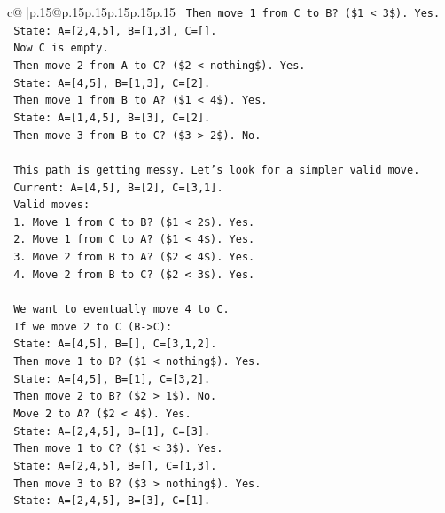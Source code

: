 \documentclass{article}
\begin{document}
{\begin{supertabular}{c@{$\;$}|p{.15\linewidth}@{}p{.15\linewidth}p{.15\linewidth}p{.15\linewidth}p{.15\linewidth}p{.15\linewidth}}
{{{\texttt{   Then move 1 from C to B? (\$1 < 3\$). Yes.} \\
\texttt{   State: A={[}2,4,5{]}, B={[}1,3{]}, C={[}{]}.} \\
\texttt{   Now C is empty.} \\
\texttt{   Then move 2 from A to C? (\$2 < nothing\$). Yes.} \\
\texttt{   State: A={[}4,5{]}, B={[}1,3{]}, C={[}2{]}.} \\
\texttt{   Then move 1 from B to A? (\$1 < 4\$). Yes.} \\
\texttt{   State: A={[}1,4,5{]}, B={[}3{]}, C={[}2{]}.} \\
\texttt{   Then move 3 from B to C? (\$3 > 2\$). No.} \\
\\ 
\texttt{   This path is getting messy. Let's look for a simpler valid move.} \\
\texttt{   Current: A={[}4,5{]}, B={[}2{]}, C={[}3,1{]}.} \\
\texttt{   Valid moves:} \\
\texttt{   1. Move 1 from C to B? (\$1 < 2\$). Yes.} \\
\texttt{   2. Move 1 from C to A? (\$1 < 4\$). Yes.} \\
\texttt{   3. Move 2 from B to A? (\$2 < 4\$). Yes.} \\
\texttt{   4. Move 2 from B to C? (\$2 < 3\$). Yes.} \\
\\ 
\texttt{   We want to eventually move 4 to C.} \\
\texttt{   If we move 2 to C (B{-}>C):} \\
\texttt{   State: A={[}4,5{]}, B={[}{]}, C={[}3,1,2{]}.} \\
\texttt{   Then move 1 to B? (\$1 < nothing\$). Yes.} \\
\texttt{   State: A={[}4,5{]}, B={[}1{]}, C={[}3,2{]}.} \\
\texttt{   Then move 2 to B? (\$2 > 1\$). No.} \\
\texttt{   Move 2 to A? (\$2 < 4\$). Yes.} \\
\texttt{   State: A={[}2,4,5{]}, B={[}1{]}, C={[}3{]}.} \\
\texttt{   Then move 1 to C? (\$1 < 3\$). Yes.} \\
\texttt{   State: A={[}2,4,5{]}, B={[}{]}, C={[}1,3{]}.} \\
\texttt{   Then move 3 to B? (\$3 > nothing\$). Yes.} \\
\texttt{   State: A={[}2,4,5{]}, B={[}3{]}, C={[}1{]}.} \\
}}}
\end{supertabular}}
\end{document}
